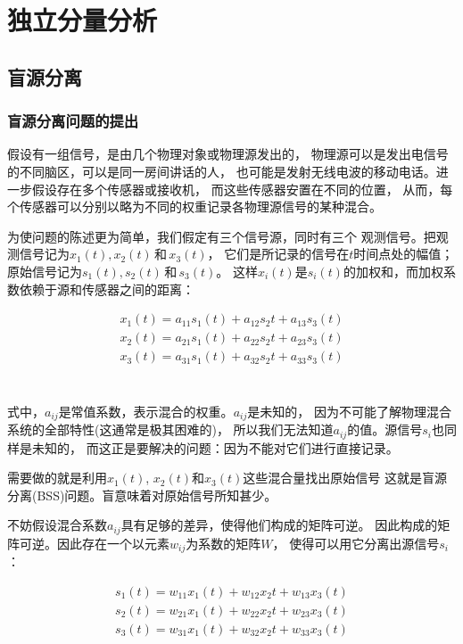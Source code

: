 ﻿%

\chapter{独立分量分析}
\label{chap02}
\section{盲源分离}

\subsection{盲源分离问题的提出}
假设有一组信号，是由几个物理对象或物理源发出的，
物理源可以是发出电信号的不同脑区，可以是同一房间讲话的人，
也可能是发射无线电波的移动电话。进一步假设存在多个传感器或接收机，
而这些传感器安置在不同的位置，
从而，每个传感器可以分别以略为不同的权重记录各物理源信号的某种混合。

为使问题的陈述更为简单，我们假定有三个信号源，同时有三个
观测信号。把观测信号记为$x_1(t), x_2(t) \,\mbox{和}\, x_3(t)$，
它们是所记录的信号在$t$时间点处的幅值；
原始信号记为$s_1(t), s_2(t)\,和\,s_3(t)$。
这样$x_i(t)$是$s_i(t)$的加权和，而加权系数依赖于源和传感器之间的距离：

\parbox{10cm}{
\begin{eqnarray*}
x_1(t)=a_{11}s_1(t)+a_{12}s_2{t}+a_{13}s_3(t) \\
x_2(t)=a_{21}s_1(t)+a_{22}s_2{t}+a_{23}s_3(t) \\
x_3(t)=a_{31}s_1(t)+a_{32}s_2{t}+a_{33}s_3(t) \\
\end{eqnarray*}
}\hfill
\parbox{3cm}{\begin{eqnarray} \label{bss_compose}\end{eqnarray}}

式中，$a_{ij}$是常值系数，表示混合的权重。$a_{ij}$是未知的，
因为不可能了解物理混合系统的全部特性(这通常是极其困难的)，
所以我们无法知道$a_{ij}$的值。源信号$s_i$也同样是未知的，
而这正是要解决的问题：因为不能对它们进行直接记录。
    
需要做的就是利用$x_1(t)$, $x_2(t)$和$x_3(t)$这些混合量找出原始信号
这就是盲源分离(BSS)问题。盲意味着对原始信号所知甚少。

不妨假设混合系数$a_{ij}$具有足够的差异，使得他们构成的矩阵可逆。
因此构成的矩阵可逆。因此存在一个以元素$w_{ij}$为系数的矩阵$W$，
使得可以用它分离出源信号$s_i$：
 
\parbox{10cm}{
\begin{eqnarray*}
s_1(t)=w_{11}x_1(t)+w_{12}x_2{t}+w_{13}x_3(t) \\
s_2(t)=w_{21}x_1(t)+w_{22}x_2{t}+w_{23}x_3(t) \\
s_3(t)=w_{31}x_1(t)+w_{32}x_2{t}+w_{33}x_3(t) \\
\end{eqnarray*}
}\hfill
\parbox{3cm}{\begin{eqnarray}\label{bss_slover} \end{eqnarray}}

